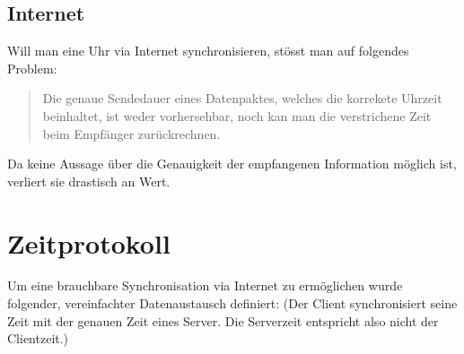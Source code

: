 \subsection{Internet} \label{Anaylse:Internet}

Will man eine Uhr via Internet synchronisieren, stösst man auf folgendes Problem:

\begin{verse}
Die genaue Sendedauer eines  Datenpaktes, welches die korrekete Uhrzeit beinhaltet, ist weder vorhersehbar, noch kan man die verstrichene Zeit beim Empfänger zurückrechnen.
\end{verse}

Da keine Aussage über die Genauigkeit der empfangenen Information möglich ist, verliert sie drastisch an Wert.

\section{Zeitprotokoll}
Um eine brauchbare Synchronisation via Internet zu ermöglichen wurde folgender, vereinfachter Datenaustausch definiert: (Der Client synchronisiert seine Zeit mit der genauen Zeit eines Server. Die Serverzeit entspricht also nicht der Clientzeit.)\cite{stackoverflowNtp}



